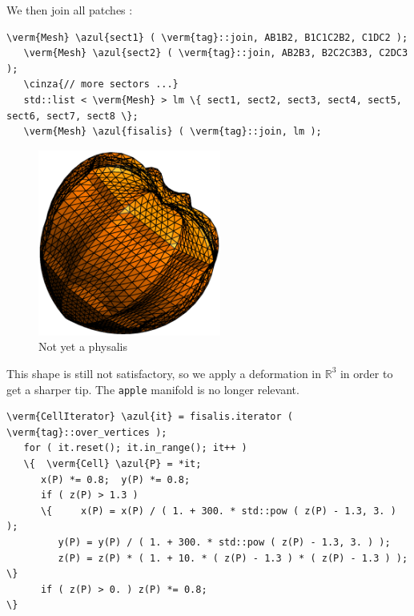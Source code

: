 We then join all patches :
\begin{Verbatim}[commandchars=\\\{\},formatcom=\small\tt,frame=single,
   label=main-\ref{\numb section 2.\numb parag 10}.cpp,rulecolor=\color{coment},
   baselinestretch=0.94,framesep=2mm]
   \verm{Mesh} \azul{sect1} ( \verm{tag}::join, AB1B2, B1C1C2B2, C1DC2 );
   \verm{Mesh} \azul{sect2} ( \verm{tag}::join, AB2B3, B2C2C3B3, C2DC3 );
   \cinza{// more sectors ...}
   std::list < \verm{Mesh} > lm \{ sect1, sect2, sect3, sect4, sect5, sect6, sect7, sect8 \};
   \verm{Mesh} \azul{fisalis} ( \verm{tag}::join, lm ); 
\end{Verbatim}

\begin{figure}[ht] \centering
  \includegraphics[width=60mm]{fisalis-round}
  \caption{Not yet a physalis}
  \label{\numb section 2.\numb fig 12}
\end{figure}

This shape is still not satisfactory, so we apply a deformation in $ \mathbb{R}^3 $ in order to
get a sharper tip.
The {\small\tt apple} manifold is no longer relevant.

\begin{Verbatim}[commandchars=\\\{\},formatcom=\small\tt,frame=single,
   label=main-\ref{\numb section 2.\numb parag 10}.cpp,rulecolor=\color{coment},
   baselinestretch=0.94,framesep=2mm]
   \verm{CellIterator} \azul{it} = fisalis.iterator ( \verm{tag}::over_vertices );
   for ( it.reset(); it.in_range(); it++ )
   \{  \verm{Cell} \azul{P} = *it;
      x(P) *= 0.8;  y(P) *= 0.8;
      if ( z(P) > 1.3 )
      \{	 x(P) = x(P) / ( 1. + 300. * std::pow ( z(P) - 1.3, 3. ) );
         y(P) = y(P) / ( 1. + 300. * std::pow ( z(P) - 1.3, 3. ) );
         z(P) = z(P) * ( 1. + 10. * ( z(P) - 1.3 ) * ( z(P) - 1.3 ) );  \}
      if ( z(P) > 0. ) z(P) *= 0.8;                                        \}
\end{Verbatim}

